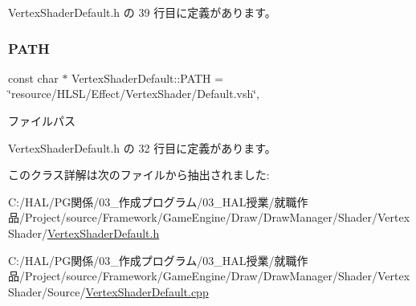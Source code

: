  Vertex\+Shader\+Default.\+h の 39 行目に定義があります。

\mbox{\label{class_vertex_shader_default_aa9890201467ac20a26bd518968474fc3}} 
\subsubsection{\texorpdfstring{P\+A\+TH}{PATH}}
{\footnotesize\ttfamily const char $\ast$ Vertex\+Shader\+Default\+::\+P\+A\+TH = \char`\"{}resource/H\+L\+SL/Effect/Vertex\+Shader/Default.\+vsh\char`\"{}\hspace{0.3cm}{\ttfamily [static]}, {\ttfamily [private]}}



ファイルパス 



 Vertex\+Shader\+Default.\+h の 32 行目に定義があります。



このクラス詳解は次のファイルから抽出されました\+:\begin{DoxyCompactItemize}
\item 
C\+:/\+H\+A\+L/\+P\+G関係/03\+\_\+作成プログラム/03\+\_\+\+H\+A\+L授業/就職作品/\+Project/source/\+Framework/\+Game\+Engine/\+Draw/\+Draw\+Manager/\+Shader/\+Vertex\+Shader/\mbox{\hyperlink{_vertex_shader_default_8h}{Vertex\+Shader\+Default.\+h}}\item 
C\+:/\+H\+A\+L/\+P\+G関係/03\+\_\+作成プログラム/03\+\_\+\+H\+A\+L授業/就職作品/\+Project/source/\+Framework/\+Game\+Engine/\+Draw/\+Draw\+Manager/\+Shader/\+Vertex\+Shader/\+Source/\mbox{\hyperlink{_vertex_shader_default_8cpp}{Vertex\+Shader\+Default.\+cpp}}\end{DoxyCompactItemize}
